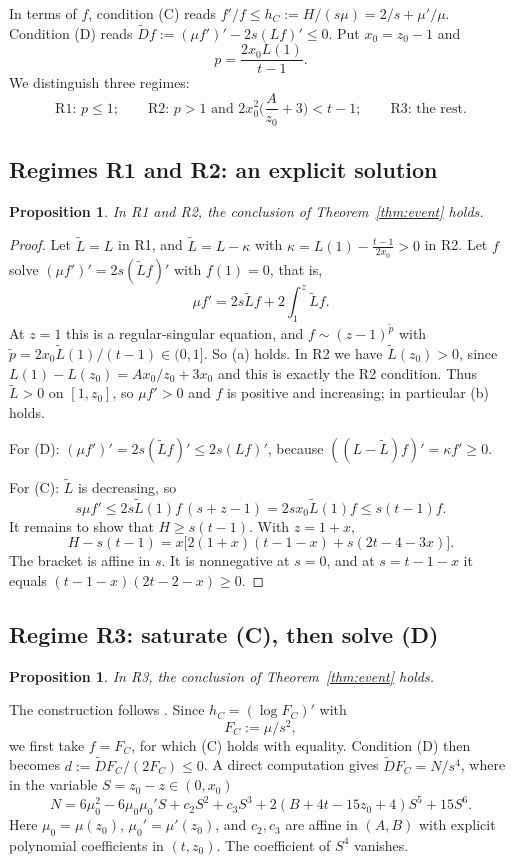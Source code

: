 \documentclass[11pt]{amsart}
\newtheorem{proposition}[theorem]{Proposition}
\theoremstyle{definition}
\theoremstyle{remark}
\numberwithin{equation}{section}
\begin{document}
In terms of $f$, condition (C) reads $f'/f\le h_C:=H/(s\mu)=2/s+\mu'/\mu$. Condition (D) reads
$\widetilde Df:=(\mu f')'-2s(Lf)'\le0$. Put $x_0=z_0-1$ and
\[
p=\frac{2x_0L(1)}{t-1}.
\]
We distinguish three regimes:
\[
\text{R1: }p\le1;\qquad\text{R2: }p>1\text{ and }2x_0^2\Big(\frac{A}{z_0}+3\Big)<t-1;\qquad\text{R3: the rest.}
\]

\subsection{Regimes R1 and R2: an explicit solution}
\begin{proposition}\label{prop:R12}
In R1 and R2, the conclusion of Theorem~\ref{thm:event} holds.
\end{proposition}
\begin{proof}
Let $\tilde L=L$ in R1, and $\tilde L=L-\kappa$ with $\kappa=L(1)-\frac{t-1}{2x_0}>0$ in R2. Let $f$ solve
$(\mu f')'=2s(\tilde Lf)'$ with $f(1)=0$, that is,
\[
\mu f'=2s\tilde Lf+2\int_1^z\tilde Lf.
\]
At $z=1$ this is a regular-singular equation, and $f\sim(z-1)^{\tilde p}$ with
$\tilde p=2x_0\tilde L(1)/(t-1)\in(0,1]$. So (a) holds. In R2 we have $\tilde L(z_0)>0$, since
$L(1)-L(z_0)=Ax_0/z_0+3x_0$ and this is exactly the R2 condition. Thus $\tilde L>0$ on $[1,z_0]$, so $\mu f'>0$ and
$f$ is positive and increasing; in particular (b) holds.

For (D): $(\mu f')'=2s(\tilde Lf)'\le2s(Lf)'$, because $((L-\tilde L)f)'=\kappa f'\ge0$.

For (C): $\tilde L$ is decreasing, so
\[
s\mu f'\le2s\tilde L(1)f\,(s+z-1)=2sx_0\tilde L(1)f\le s(t-1)f.
\]
It remains to show that $H\ge s(t-1)$. With $z=1+x$,
\[
H-s(t-1)=x\big[2(1+x)(t-1-x)+s(2t-4-3x)\big].
\]
The bracket is affine in $s$. It is nonnegative at $s=0$, and at $s=t-1-x$ it equals $(t-1-x)(2t-2-x)\ge0$.
\end{proof}

\subsection{Regime R3: saturate (C), then solve (D)}
\begin{proposition}\label{prop:R3}
In R3, the conclusion of Theorem~\ref{thm:event} holds.
\end{proposition}

The construction follows \cite[\S4.3.3]{Hin26}. Since $h_C=(\log F_C)'$ with
\[
F_C:=\mu/s^2,
\]
we first take $f=F_C$, for which (C) holds with equality. Condition (D) then becomes
$d:=\widetilde DF_C/(2F_C)\le0$. A direct computation gives $\widetilde DF_C=N/s^4$, where in the variable
$S=z_0-z\in(0,x_0)$
\begin{equation}\label{eq:N}
N=6\mu_0^2-6\mu_0\mu_0'S+c_2S^2+c_3S^3+2(B+4t-15z_0+4)S^5+15S^6.
\end{equation}
Here $\mu_0=\mu(z_0)$, $\mu_0'=\mu'(z_0)$, and $c_2,c_3$ are affine in $(A,B)$ with explicit polynomial
coefficients in $(t,z_0)$. The coefficient of $S^4$ vanishes.
\end{document}
